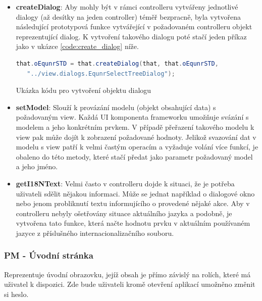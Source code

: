 \documentclass[thesis=M,czech]{FITthesis}[2012/06/26]
\begin{document}
\begin{itemize}
	\item
	\textbf{createDialog}: Aby mohly být v rámci controlleru vytvářeny jednotlivé dialogy (až desítky na jeden controller) téměř bezpracně, byla vytvořena následující prototypová funkce vytvářející v požadovaném controlleru objekt reprezentující dialog. K vytvoření takového dialogu poté stačí jeden příkaz jako v ukázce \ref{code:create_dialog} níže. 
\begin{algorithm}[H]
	\begin{lstlisting}[language=java]      
that.oEqunrSTD = that.createDialog(that, that.oEqunrSTD,
   "../view.dialogs.EqunrSelectTreeDialog");
	\end{lstlisting}
	\caption{Ukázka kódu pro vytvoření objektu dialogu}	
	\label{code:create_dialog}
\end{algorithm}		
	\item
	\textbf{setModel}: Slouží k provázání modelu (objekt obsahující data) s požadovaným view. Každá UI komponenta frameworku umožňuje svázání s modelem a jeho konkrétním prvkem. V případě přeřazení takového modelu k view pak může dojít k zobrazení požadované hodnoty. Jelikož svazování dat v modelu s view patří k velmi častým operacím a vyžaduje volání více funkcí, je obaleno do této metody, které stačí předat jako parametr požadovaný model a jeho jméno.
	\item
	\textbf{getI18NText}: Velmi často v controlleru dojde k situaci, že je potřeba uživateli sdělit nějakou informaci. Může se jednat například o dialogové okno nebo jenom probliknutí textu informujícího o provedené nějaké akce. Aby v controlleru nebyly ošetřovány situace aktuálního jazyka a podobně, je vytvořena tato funkce, která načte hodnotu prvku v aktuálním používaném jazyce z příslušného internacionalizačního souboru. 
\end{itemize}	

\subsubsection{PM - Úvodní stránka}
\label{sssec:fiori_pm}
Reprezentuje úvodní obrazovku, jejíž obsah je přímo závislý na rolích, které má uživatel k dispozici. Zde bude uživateli kromě otevření aplikací umožněno změnit si heslo.
\end{document}
